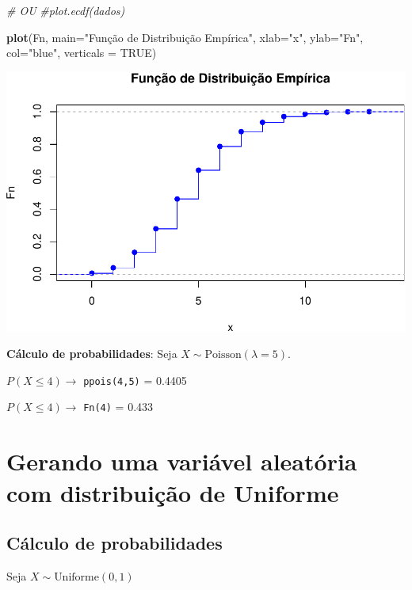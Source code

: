 \documentclass[
]{book}
\newenvironment{Shaded}{\begin{snugshade}}{\end{snugshade}}
\newcommand{\AttributeTok}[1]{\textcolor[rgb]{0.13,0.29,0.53}{#1}}
\newcommand{\CommentTok}[1]{\textcolor[rgb]{0.56,0.35,0.01}{\textit{#1}}}
\newcommand{\ConstantTok}[1]{\textcolor[rgb]{0.56,0.35,0.01}{#1}}
\newcommand{\FunctionTok}[1]{\textcolor[rgb]{0.13,0.29,0.53}{\textbf{#1}}}
\newcommand{\NormalTok}[1]{#1}
\newcommand{\StringTok}[1]{\textcolor[rgb]{0.31,0.60,0.02}{#1}}
\begin{document}
\begin{Shaded}
\begin{Highlighting}[]
\CommentTok{\# OU}
\CommentTok{\#plot.ecdf(dados)}

\FunctionTok{plot}\NormalTok{(Fn, }\AttributeTok{main=}\StringTok{"Função de Distribuição Empírica"}\NormalTok{,}
     \AttributeTok{xlab=}\StringTok{"x"}\NormalTok{,}
     \AttributeTok{ylab=}\StringTok{"Fn"}\NormalTok{,}
     \AttributeTok{col=}\StringTok{"blue"}\NormalTok{,}
     \AttributeTok{verticals =} \ConstantTok{TRUE}\NormalTok{)}
\end{Highlighting}
\end{Shaded}

\includegraphics{meuLivro2_files/figure-latex/unnamed-chunk-132-2.pdf}

\textbf{Cálculo de probabilidades}: Seja \(X\sim\text{Poisson}(\lambda=5)\).

\(P(X\leq 4) \to\) \texttt{ppois(4,5)} = 0.4405

\(P(X \leq 4) \to\) \texttt{Fn(4)} = 0.433

\section{Gerando uma variável aleatória com distribuição de Uniforme}\label{gerando-uma-variuxe1vel-aleatuxf3ria-com-distribuiuxe7uxe3o-de-uniforme}

\subsection{Cálculo de probabilidades}\label{cuxe1lculo-de-probabilidades-2}

Seja \(X\sim \text{Uniforme}(0,1)\)
\end{document}

